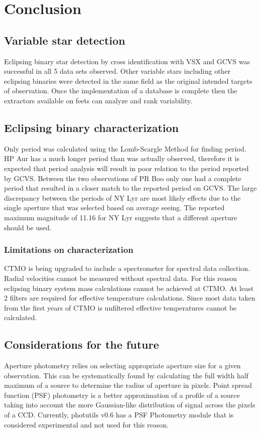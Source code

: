 \chapter{Conclusion}
\section{Variable star detection}
Eclipsing binary star detection by cross identification with VSX and GCVS was successful in all 5 data sets observed.
Other variable stars including other eclipsing binaries were detected in the same field as the original intended targets of observation.
Once the implementation of a database is complete then the extractors available on feets can analyze and rank variability. 

\section{Eclipsing binary characterization}
Only period was calculated using the Lomb-Scargle Method for finding period.
HP Aur has a much longer period than was actually observed, therefore it is expected that period analysis will result in poor
relation to the period reported by GCVS\@.
Between the two observations of PR Boo only one had a complete period that resulted in a closer match to the reported period on GCVS\@.
The large discrepancy between the periods of NY Lyr are most likely effects due to the single aperture that was selected based
on average seeing. The reported maximum magnitude of 11.16 for NY Lyr suggests that a different aperture should be used.

\subsection{Limitations on characterization}
CTMO is being upgraded to include a spectrometer for spectral data collection.
Radial velocities cannot be measured without spectral data.
For this reason eclipsing binary system mass calculations cannot be achieved at CTMO\@.
At least 2 filters are required for effective temperature calculations.
Since most data taken from the first years of CTMO is unfiltered effective temperatures cannot be calculated.

\section{Considerations for the future}
Aperture photometry relies on selecting appropriate aperture size for a given observation.
This can be systematically found by calculating the full width half maximum of a source to determine the radius of aperture in pixels.
Point spread function (PSF) photometry is a better approximation of a profile of a source taking into account the more Gaussian-like
distribution of signal across the pixels of a CCD\@.
Currently, photutils v0.6 has a PSF Photometry module that is considered experimental and not used for this reason. 

